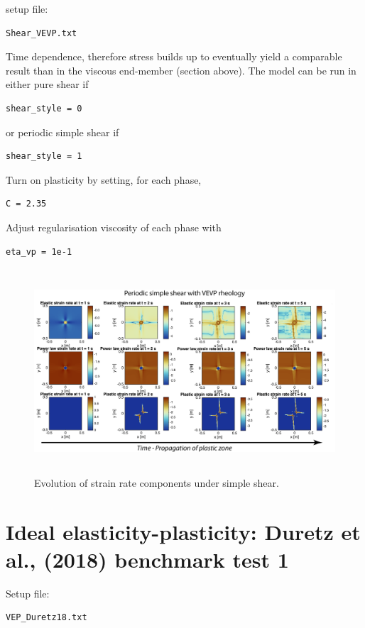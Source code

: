 \documentclass[12pt,english,openany]{scrbook}
\begin{document}
setup file:
\begin{verbatim} 
Shear_VEVP.txt
\end{verbatim}

Time dependence, therefore stress builds up to eventually yield a comparable result than in the viscous end-member (section above).
The model can be run in either pure shear if 
\begin{verbatim} 
shear_style = 0
\end{verbatim}

or periodic simple shear if 
\begin{verbatim} 
shear_style = 1
\end{verbatim}

Turn on plasticity by setting, for each phase,
\begin{verbatim} 
C = 2.35
\end{verbatim}

Adjust regularisation viscosity of each phase with
\begin{verbatim} 
eta_vp = 1e-1
\end{verbatim}

\begin{figure}[ht!]
\centerline{\includegraphics[height=3.0in]{./Figures/PeriodicSimpleShearVEVP_MDOODZ.png}}
\caption{Evolution of strain rate components under simple shear.}
\label{PeriodicSimpleShearVEVP_MDOODZ}
\end{figure}

\section{Ideal elasticity-plasticity: Duretz et al., (2018) benchmark test 1}

Setup file:
\begin{verbatim} 
VEP_Duretz18.txt
\end{verbatim}
\end{document}
